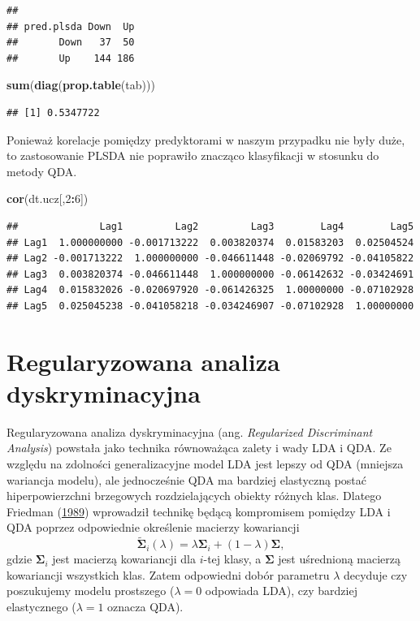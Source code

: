 \documentclass[]{book}
\newenvironment{Shaded}{\begin{snugshade}}{\end{snugshade}}
\newcommand{\DecValTok}[1]{\textcolor[rgb]{0.00,0.00,0.81}{#1}}
\newcommand{\KeywordTok}[1]{\textcolor[rgb]{0.13,0.29,0.53}{\textbf{#1}}}
\newcommand{\NormalTok}[1]{#1}
\newcommand{\OperatorTok}[1]{\textcolor[rgb]{0.81,0.36,0.00}{\textbf{#1}}}
\theoremstyle{plain}
\theoremstyle{definition}
\theoremstyle{definition}
\theoremstyle{definition}
\theoremstyle{definition}
\theoremstyle{remark}
\begin{document}
\begin{verbatim}
##           
## pred.plsda Down  Up
##       Down   37  50
##       Up    144 186
\end{verbatim}

\begin{Shaded}
\begin{Highlighting}[]
\KeywordTok{sum}\NormalTok{(}\KeywordTok{diag}\NormalTok{(}\KeywordTok{prop.table}\NormalTok{(tab)))}
\end{Highlighting}
\end{Shaded}

\begin{verbatim}
## [1] 0.5347722
\end{verbatim}

Ponieważ korelacje pomiędzy predyktorami w naszym przypadku nie były duże, to zastosowanie PLSDA nie poprawiło znacząco klasyfikacji w stosunku do metody QDA.

\begin{Shaded}
\begin{Highlighting}[]
\KeywordTok{cor}\NormalTok{(dt.ucz[,}\DecValTok{2}\OperatorTok{:}\DecValTok{6}\NormalTok{])}
\end{Highlighting}
\end{Shaded}

\begin{verbatim}
##              Lag1         Lag2         Lag3        Lag4        Lag5
## Lag1  1.000000000 -0.001713222  0.003820374  0.01583203  0.02504524
## Lag2 -0.001713222  1.000000000 -0.046611448 -0.02069792 -0.04105822
## Lag3  0.003820374 -0.046611448  1.000000000 -0.06142632 -0.03424691
## Lag4  0.015832026 -0.020697920 -0.061426325  1.00000000 -0.07102928
## Lag5  0.025045238 -0.041058218 -0.034246907 -0.07102928  1.00000000
\end{verbatim}

\hypertarget{regularyzowana-analiza-dyskryminacyjna}{%
\section{Regularyzowana analiza dyskryminacyjna}\label{regularyzowana-analiza-dyskryminacyjna}}

Regularyzowana analiza dyskryminacyjna (ang. \emph{Regularized Discriminant Analysis}) powstała jako technika równoważąca zalety i wady LDA i QDA. Ze względu na zdolności generalizacyjne model LDA jest lepszy od QDA (mniejsza wariancja modelu), ale jednocześnie QDA ma bardziej elastyczną postać hiperpowierzchni brzegowych rozdzielających obiekty różnych klas. Dlatego Friedman (\protect\hyperlink{ref-friedman1989}{1989}) wprowadził technikę będącą kompromisem pomiędzy LDA i QDA poprzez odpowiednie określenie macierzy kowariancji
\begin{equation}
    \tilde{\boldsymbol \Sigma}_i(\lambda) = \lambda\boldsymbol\Sigma_i + (1-\lambda)\boldsymbol\Sigma,
\end{equation}
gdzie \(\boldsymbol \Sigma_i\) jest macierzą kowariancji dla \(i\)-tej klasy, a \(\boldsymbol \Sigma\) jest uśrednioną macierzą kowariancji wszystkich klas. Zatem odpowiedni dobór parametru \(\lambda\) decyduje czy poszukujemy modelu prostszego (\(\lambda = 0\) odpowiada LDA), czy bardziej elastycznego (\(\lambda=1\) oznacza QDA).
\end{document}
